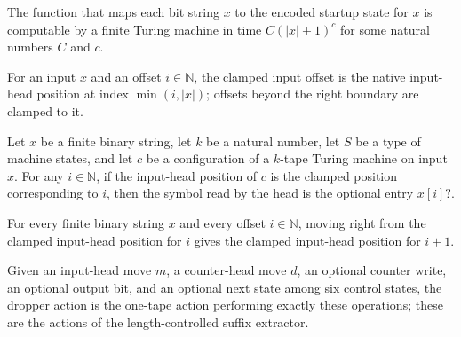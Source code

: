 \begin{lemma}
\label{Complexity.satStreamStart_poly}
\leanok
{}
The function that maps each bit string $x$ to the encoded startup state for $x$ is
computable by a finite Turing machine in time $C(|x|+1)^c$ for some natural numbers $C$
and $c$.
\end{lemma}
\begin{definition}
\label{Complexity.satStreamPos}
\leanok
For an input $x$ and an offset $i \in \mathbb{N}$, the clamped input offset is the
native input-head position at index $\min(i, |x|)$; offsets beyond the right
boundary are clamped to it.
\end{definition}

\begin{lemma}
\label{Complexity.satStreamPos_read}
\leanok
{}
Let $x$ be a finite binary string, let $k$ be a natural number, let $S$ be a type of
machine states, and let $c$ be a configuration of a $k$-tape Turing machine on input
$x$. For any $i \in \mathbb{N}$, if the input-head position of $c$ is the clamped
position corresponding to $i$, then the symbol read by the head is the optional entry
$x[i]?$.
\end{lemma}

\begin{lemma}
\label{Complexity.satStreamPos_succ}
\leanok
{}
For every finite binary string $x$ and every offset $i\in\mathbb{N}$, moving right from
the clamped input-head position for $i$ gives the clamped input-head position for $i+1$.
\end{lemma}

\begin{definition}
\label{Complexity.satDropAction}
\leanok
{}
Given an input-head move $m$, a counter-head move $d$, an optional counter write,
an optional output bit, and an optional next state among six control states, the
dropper action is the one-tape action performing exactly these operations; these
are the actions of the length-controlled suffix extractor.
\end{definition}

